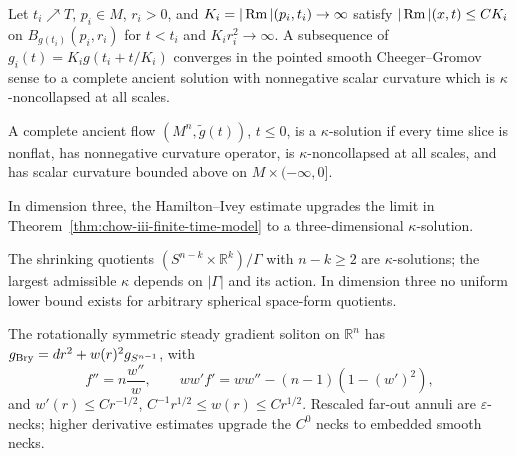 \begin{theorem}
\label{thm:chow-iii-finite-time-model}
Let $t_i\nearrow T$, $p_i\in M$, $r_i>0$, and
$K_i=|\operatorname{Rm}|(p_i,t_i)\to\infty$ satisfy
$|\operatorname{Rm}|(x,t)\le CK_i$ on $B_{g(t_i)}(p_i,r_i)$ for $t<t_i$ and
$K_i r_i^2\to\infty$.  A subsequence of
$g_i(t)=K_i g(t_i+t/K_i)$ converges in the pointed smooth
Cheeger--Gromov sense to a complete ancient solution with nonnegative scalar
curvature which is $\kappa$-noncollapsed at all scales.
\end{theorem}

\begin{definition}
\label{def:chow-iii-kappa-solution}
A complete ancient flow $(M^n,\tilde g(t))$, $t\le0$, is a $\kappa$-solution
if every time slice is nonflat, has nonnegative curvature operator, is
$\kappa$-noncollapsed at all scales, and has scalar curvature bounded above
on $M\times(-\infty,0]$.
\end{definition}

\begin{corollary}
\label{cor:chow-iii-3d-finite-time-model}
In dimension three, the Hamilton--Ivey estimate upgrades the limit in
Theorem~\ref{thm:chow-iii-finite-time-model} to a three-dimensional
$\kappa$-solution.
\end{corollary}

\begin{example}
\label{ex:chow-iii-cylinder-kappa}
The shrinking quotients $(S^{n-k}\times\mathbb R^k)/\Gamma$ with
$n-k\ge2$ are $\kappa$-solutions; the largest admissible $\kappa$ depends on
$|\Gamma|$ and its action.  In dimension three no uniform lower bound exists
for arbitrary spherical space-form quotients.
\end{example}

\begin{example}
\label{ex:chow-iii-bryant-soliton}
The rotationally symmetric steady gradient soliton on $\mathbb R^n$ has
$g_{\rm Bry}=dr^2+w(r)^2g_{S^{n-1}}$, with
\[
f''=n\frac{w''}{w},\qquad ww'f'=ww''-(n-1)(1-(w')^2),
\]
and $w'(r)\le Cr^{-1/2}$, $C^{-1}r^{1/2}\le w(r)\le Cr^{1/2}$.  Rescaled
far-out annuli are $\varepsilon$-necks; higher derivative estimates upgrade
the $C^0$ necks to embedded smooth necks.
\end{example}

